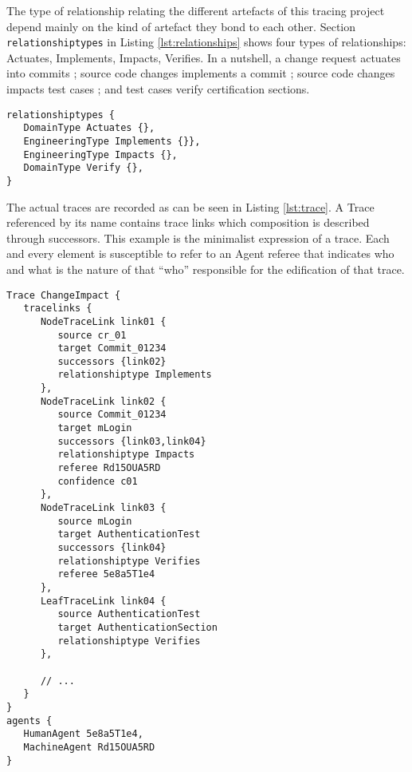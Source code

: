 The type of relationship relating the different artefacts of this tracing project depend mainly on the kind of artefact they bond to each other. Section \texttt{relationshiptypes} in Listing \ref{lst:relationships} shows four types of relationships: Actuates, Implements, Impacts, Verifies. In a nutshell, a change request actuates into commits ; source code changes implements a commit ; source code changes impacts test cases ; and test cases verify certification sections.

\begin{lstlisting}[caption=Relationship types,label=lst:relationships]
relationshiptypes {
   DomainType Actuates {},
   EngineeringType Implements {}},
   EngineeringType Impacts {},
   DomainType Verify {},
}
\end{lstlisting}


The actual traces are recorded as can be seen in Listing \ref{lst:trace}. A Trace referenced by its name contains trace links which composition is described through successors. This example is the minimalist expression of a trace. Each and every element is susceptible to refer to an Agent referee that indicates who and what is the nature of that “who” responsible for the edification of that trace. 
\begin{lstlisting}[caption=Trace instance,label=lst:trace]
Trace ChangeImpact {
   tracelinks {  
      NodeTraceLink link01 { 
         source cr_01
         target Commit_01234 
         successors {link02}
         relationshiptype Implements  
      },
      NodeTraceLink link02 { 
         source Commit_01234 
         target mLogin 
         successors {link03,link04}
         relationshiptype Impacts  
         referee Rd15OUA5RD
         confidence c01
      },
      NodeTraceLink link03 { 
         source mLogin 
         target AuthenticationTest
         successors {link04}
         relationshiptype Verifies  
         referee 5e8a5T1e4
      },
      LeafTraceLink link04 { 
         source AuthenticationTest
         target AuthenticationSection
         relationshiptype Verifies  
      },
	
      // ...
   }
}
agents {
   HumanAgent 5e8a5T1e4,
   MachineAgent Rd15OUA5RD 
}
\end{lstlisting}

